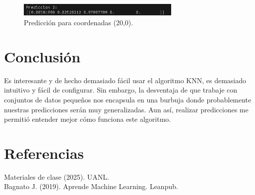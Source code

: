 \documentclass{article}
\begin{document}
\begin{figure}[H]
    \centering
    \includegraphics[width=0.7\textwidth]{img/24.png}
    \caption{Predicción para coordenadas (20,0).}
\end{figure}

\section{Conclusión}
Es interesante y de hecho demasiado fácil usar el algoritmo KNN, es demasiado intuitivo y fácil de configurar. Sin embargo, la desventaja de que trabaje con conjuntos de datos pequeños nos encapsula en una burbuja donde probablemente nuestras predicciones serán muy generalizadas. Aun así, realizar predicciones me permitió entender mejor cómo funciona este algoritmo.

\section{Referencias}
Materiales de clase (2025). UANL.\\
Bagnato J. (2019). Aprende Machine Learning. Leanpub.
\end{document}
